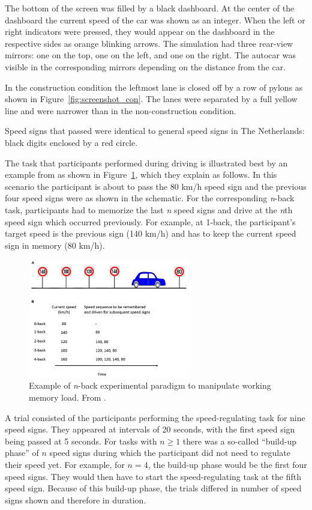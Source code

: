 The bottom of the screen was filled by a black dashboard. 
At the center of the dashboard the current speed of the car was shown as an integer.
When the left or right indicators were pressed, they would appear on the dashboard in the respective sides as orange blinking arrows. 
The simulation had three rear-view mirrors: one on the top, one on the left, and one on the right. 
The autocar was visible in the corresponding mirrors depending on the distance from the car. 

In the construction condition the leftmost lane is closed off by a row of pylons as shown in Figure~\ref{fig:screenshot_con}. 
The lanes were separated by a full yellow line and were narrower than in the non-construction condition. 

Speed signs that passed were identical to general speed signs in The Netherlands: black digits enclosed by a red circle. 

The \nback task that participants performed during driving is illustrated best by an example from \citet{Unni2017} as shown in Figure~\ref{fig:nback_scheme}, which they explain as follows.
In this scenario the participant is about to pass the 80 km/h speed sign and the previous four speed signs were as shown in the schematic. 
For the corresponding \textit{n}-back task, participants had to memorize the last \textit{n} speed signs and drive at the \textit{n}th speed sign which occurred previously.
For example, at 1-back, the participant’s target speed is the previous sign (140 km/h) and has to keep the current speed sign in memory (80 km/h).

\begin{figure}
  \centering
  \includegraphics[width=7cm]{images/nback_Scheunemann.pdf}
  \caption{Example of \textit{n}-back experimental paradigm to manipulate working memory load. From \citet{Unni2017}.}
  \label{fig:nback_scheme}
\end{figure}

A trial consisted of the participants performing the speed-regulating task for nine speed signs. 
They appeared at intervals of 20 seconds, with the first speed sign being passed at 5 seconds.
For \nback tasks with \(n \geq 1\) there was a so-called ``build-up phase'' of \(n\) speed signs during which the participant did not need to regulate their speed yet. 
For example, for \(n = 4\), the build-up phase would be the first four speed signs. 
They would then have to start the speed-regulating task at the fifth speed sign.
Because of this build-up phase, the \nback trials differed in number of speed signs shown and therefore in duration.

